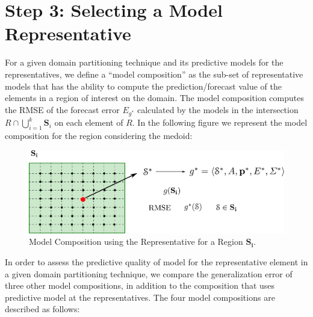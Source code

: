 \section{Step 3: Selecting a Model Representative}
\label{Sec:KnowledgExtraction}

For a given domain partitioning technique and its predictive models for the representatives, we define a ``model composition'' as the sub-set of representative models that has the ability to compute the prediction/forecast value of the elements in a region of interest on the domain. 
The model composition computes the RMSE of the forecast error $E_{g^{*}}$ calculated by the models in the intersection $R \cap \bigcup_{i=1}^{k} \mathbf{S}_{i}$ on each element of $R$.  In the following figure we represent the model composition for the region considering the medoid:
\begin{figure}[h]
	\centering
	\includegraphics[scale=0.35]{../Figures/ModelCompositionRegion}
	\caption{Model Composition using the Representative for a Region $\mathbf{S_{i}}$.}
	\label{Fig:ModelRegion}
\end{figure}

In order to assess the predictive quality of model for the representative element in a given domain partitioning  technique, we compare the generalization error of three other model compositions, in addition to the composition that uses predictive model at the representatives. The four model compositions are described as follows: %

